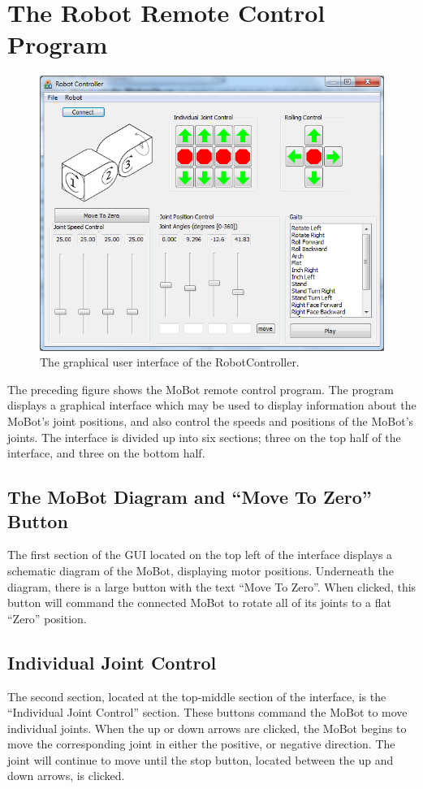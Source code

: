 \documentclass{article}
\begin{document}
\section{ The Robot Remote Control Program }
\begin{figure}[H]
\begin{center}
\includegraphics[width=4.5in]{images/shot1_populated.png}
\end{center}
\caption{\label{fig:shot1_populated.png} The graphical user interface of the RobotController.}
\end{figure}

The preceding figure shows the MoBot remote control program. The
program displays a graphical interface which may be used to display
information about the MoBot's joint positions, and also control the
speeds and positions of the MoBot's joints. The interface is divided
up into six sections; three on the top half of the interface, and three on 
the bottom half. 

\subsection{The MoBot Diagram and ``Move To Zero'' Button}
The first section of the GUI located on the top left of the interface
displays a schematic diagram of the MoBot, displaying motor positions.
Underneath the diagram, there is a large button with the text 
``Move To Zero''. When clicked, this button will command the connected
MoBot to rotate all of its joints to a flat ``Zero'' position.

\subsection{Individual Joint Control}
The second section, located at the top-middle section of the interface,
is the ``Individual Joint Control'' section. These buttons command the
MoBot to move individual joints. When the up or down arrows are clicked,
the MoBot begins to move the corresponding joint in either the positive,
or negative direction. The joint will continue to move until the stop 
button, located between the up and down arrows, is clicked. 
\end{document}

